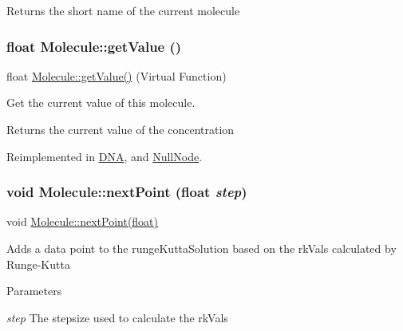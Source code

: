 \begin{DoxyReturn}{Returns}
the short name of the current molecule 
\end{DoxyReturn}
\hypertarget{classMolecule_a554ea822918374775d5f52b5d49d8195}{
\subsubsection[{getValue}]{\setlength{\rightskip}{0pt plus 5cm}float Molecule::getValue ()}}
\label{classMolecule_a554ea822918374775d5f52b5d49d8195}
float \hyperlink{classMolecule_a554ea822918374775d5f52b5d49d8195}{Molecule::getValue()} (Virtual Function)

Get the current value of this molecule.

\begin{DoxyReturn}{Returns}
the current value of the concentration 
\end{DoxyReturn}


Reimplemented in \hyperlink{classDNA_ac3f4ef00894483313ea44df6a85b3bab}{DNA}, and \hyperlink{classNullNode_ae1cddbf915028ab4f2aebf6879c6a682}{NullNode}.\hypertarget{classMolecule_af67c8a4dcbde3f500509ee1bd94ff4ef}{
\subsubsection[{nextPoint}]{\setlength{\rightskip}{0pt plus 5cm}void Molecule::nextPoint (float {\em step})}}
\label{classMolecule_af67c8a4dcbde3f500509ee1bd94ff4ef}
void \hyperlink{classMolecule_af67c8a4dcbde3f500509ee1bd94ff4ef}{Molecule::nextPoint(float)}

Adds a data point to the rungeKuttaSolution based on the rkVals calculated by Runge-\/Kutta


\begin{DoxyParams}{Parameters}
\item[{\em step}]The stepsize used to calculate the rkVals \end{DoxyParams}


